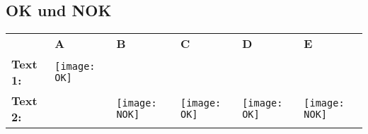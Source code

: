 \documentclass[a4paper, 12pt, xcolor=dvipsnames]{scrartcl}	%
\begin{document}
\subsection{OK und NOK}
\begin{center}
	\begin{tabular}{m{3.0cm}m{1.0cm}m{1.0cm}m{1.0cm}m{1.0cm}m{1.0cm}} 
		&\textbf{A} &\textbf{B} & \textbf{C} & \textbf{D} & \textbf{E} \\ 
		\textbf{Text 1:} & \texttt{[image: OK]} &  & &  &  \\
		\textbf{Text 2:} &  & \texttt{[image: NOK]} & \texttt{[image: OK]} & \texttt{[image: OK]} & \texttt{[image: NOK]} \\ 
	\end{tabular}
\end{center}

%
%
\end{document}
